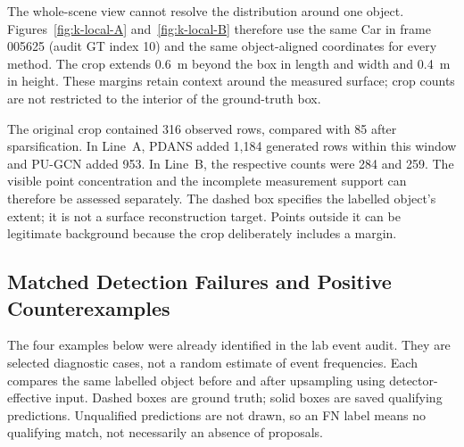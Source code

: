 
The whole-scene view cannot resolve the distribution around one object.
Figures~\ref{fig:k-local-A} and~\ref{fig:k-local-B} therefore use the
same Car in frame 005625 (audit GT index 10) and the same object-aligned
coordinates for every method. The crop extends 0.6~m beyond the box in
length and width and 0.4~m in height. These margins retain context
around the measured surface; crop counts are not restricted to the
interior of the ground-truth box.

The original crop contained 316 observed rows, compared with 85 after
sparsification. In Line~A, PDANS added 1,184 generated rows within this
window and PU-GCN added 953. In Line~B, the respective counts were
284 and 259. The visible point concentration and the incomplete
measurement support can therefore be assessed separately.
The dashed box specifies the labelled object's extent; it is not a
surface reconstruction target. Points outside it can be legitimate
background because the crop deliberately includes a margin.

\FloatBarrier
\subsection{Matched Detection Failures and Positive Counterexamples}
\label{sec:kitti-matched-cases}


The four examples below were already identified in the lab event audit.
They are selected diagnostic cases, not a random estimate of event
frequencies. Each compares the same labelled object before and after
upsampling using detector-effective input. Dashed boxes are ground
truth; solid boxes are saved qualifying predictions. Unqualified
predictions are not drawn, so an FN label means no qualifying match,
not necessarily an absence of proposals.

